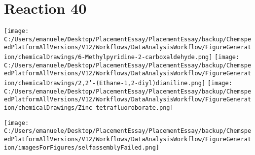 \documentclass{article}%
\begin{document}
\section*{Reaction 40}%
%
\begin{scheme}[H]%
\begin{minipage}{0.5\textwidth}%
\texttt{[image: C:/Users/emanuele/Desktop/PlacementEssay/PlacementEssay/backup/ChemspeedPlatformAllVersions/V12/Workflows/DataAnalysisWorkflow/FigureGeneration/chemicalDrawings/6-Methylpyridine-2-carboxaldehyde.png]}%
\texttt{[image: C:/Users/emanuele/Desktop/PlacementEssay/PlacementEssay/backup/ChemspeedPlatformAllVersions/V12/Workflows/DataAnalysisWorkflow/FigureGeneration/chemicalDrawings/2,2'-(Ethane-1,2-diyl)dianiline.png]}%
\texttt{[image: C:/Users/emanuele/Desktop/PlacementEssay/PlacementEssay/backup/ChemspeedPlatformAllVersions/V12/Workflows/DataAnalysisWorkflow/FigureGeneration/chemicalDrawings/Zinc tetrafluoroborate.png]}%
\end{minipage}%
\begin{minipage}{0.5\textwidth}%
\begin{center}%
\texttt{[image: C:/Users/emanuele/Desktop/PlacementEssay/PlacementEssay/backup/ChemspeedPlatformAllVersions/V12/Workflows/DataAnalysisWorkflow/FigureGeneration/imagesForFigures/selfassemblyFailed.png]}%
\end{center}%
\end{minipage}%
\caption{Self-assembly of components 8, 20, with Zinc(II) in a 3.0:1.5:1.0 molar ratio in CH$_3$CN at 60\textdegree C for 40h. These are the reagents (starting materials) for reaction 40.}%
\end{scheme}%
\end{document}

